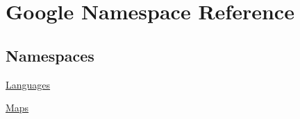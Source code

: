 \hypertarget{a00038}{}\section{Google Namespace Reference}
\label{a00038}
\subsection*{Namespaces}
\begin{DoxyCompactItemize}
\item 
 \hyperlink{a00042}{Languages}
\item 
 \hyperlink{a00039}{Maps}
\end{DoxyCompactItemize}
